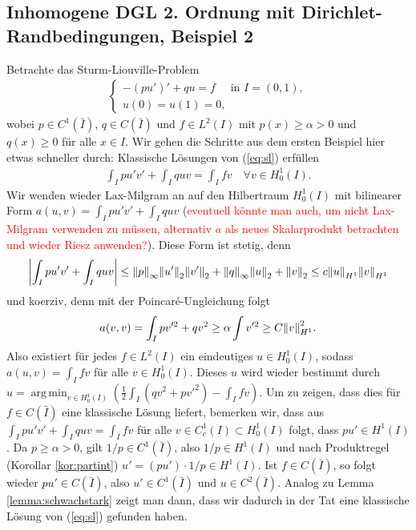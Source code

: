 \documentclass[twoside]{article}
\theoremstyle{definition}
\DeclareMathOperator*{\argmin}{arg\,min}
\begin{document}
\subsection{Inhomogene DGL 2. Ordnung mit Dirichlet-Randbedingungen, Beispiel 2}
Betrachte das Sturm-Liouville-Problem
\begin{align}
\begin{cases}
-(pu')' + qu = f \quad \text{ in } I=(0,1),\\
u(0)=u(1)=0,
\end{cases} \label{eq:sl}
\end{align}
wobei $p \in C^1(\bar{I})$, $q \in C(\bar{I})$ und $f \in L^2(I)$ mit $p(x) \geq \alpha > 0$ und $q(x) \geq 0 $ für alle $x \in I$. Wir gehen die Schritte aus dem ersten Beispiel hier etwas schneller durch: Klassische Lösungen von (\ref{eq:sl}) erfüllen
\begin{align*}
\int_I pu'v' +\int_I quv = \int_I fv \quad \forall v \in H_0^1(I).
\end{align*}
Wir wenden wieder Lax-Milgram an auf den Hilbertraum $H^1_0(I)$ mit bilinearer Form $a(u,v)=\int_I pu'v' +\int_I quv$ (\textcolor{red}{eventuell könnte man auch, um nicht Lax-Milgram verwenden zu müssen, alternativ $a$ als neues Skalarprodukt betrachten und wieder Riesz anwenden?}). Diese Form ist stetig, denn
\begin{align*}
\abs{\int_I pu'v' + \int_I quv} \leq \norm{p}_\infty \norm{u'}_2 \norm{v'}_2  + \norm{q}_\infty \norm{u}_2 + \norm{v}_2 \leq c \norm{u}_{H^1}
\norm{v}_{H^1}
\end{align*}
und koerziv, denn mit der Poincar{\'e}-Ungleichung folgt
\begin{align*}
a(v,v) = \int_I p v'^2 + q v^2 \geq \alpha \int v'^2 \geq C \norm{v}_{H^1}^2.
\end{align*}
Also existiert für jedes $f \in L^2(I)$ ein eindeutiges $u \in H^1_0(I)$, sodass $a(u,v)= \int_I fv$ für alle $v \in H^1_0(I)$. Dieses $u$ wird wieder bestimmt durch $u= \argmin_{v \in H^1_0(I)}\left(\frac{1}{2}\int_I (qv^2+pv'^2)-\int_I fv \right)$. Um zu zeigen, dass dies für $f \in C(\bar{I})$ eine klassische Lösung liefert, bemerken wir, dass aus $\int_I pu'v' +\int_I quv = \int_I fv$ für alle $v \in C_c^1(I) \subset H_0^1(I)$ folgt, dass $pu' \in H^1(I)$. Da $p \geq \alpha > 0$, gilt $1/p \in C^1(\bar{I})$, also $1/p \in H^1(I)$ und nach Produktregel (Korollar \ref{kor:partint}) $u' = (pu') \cdot 1/p \in H^1(I)$. Ist $f \in C(\bar{I})$, so folgt wieder $pu' \in C(\bar{I})$, also $u' \in C^1(\bar{I})$ und $u \in C^2(\bar{I})$. Analog zu Lemma \ref{lemma:schwachstark} zeigt man dann, dass wir dadurch in der Tat eine klassische Lösung von (\ref{eq:sl}) gefunden haben.
\end{document}

